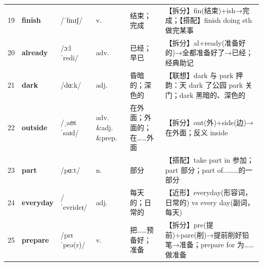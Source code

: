 \documentclass[UTF8,a4paper,11pt,oneside]{ctexbook}
\newcommand{\cellword}[1]{{\bfseries\textcolor{wordcol}{#1}}}
\newcommand{\cellipa}[1]{{\footnotesize\textcolor{ipacol}{#1}}}
\newcommand{\cellpos}[1]{\textcolor{poscol}{#1}}
\newcommand{\cellno}[1]{\textcolor{volcolor!75!black}{#1}}
\begin{document}
{\begin{longtable}{@{}C{0.045\textwidth}L{0.155\textwidth}L{0.175\textwidth}C{0.070\textwidth}L{0.180\textwidth}L{0.282\textwidth}@{}}
 \cellno{19} & \cellword{finish} & \cellipa{/ˈfɪnɪʃ/} & \cellpos{v.} & 结束；完成 & \textcolor{tagSplit}{【拆分】}fin(结束)+ish→\allowbreak{}完成；\textcolor{tagColloc}{【搭配】}finish doing sth 做完某事 \\
\cellno{20} & \cellword{already} & \cellipa{/ɔːlˈredi/} & \cellpos{adv.} & 已经；早已 & \textcolor{tagSplit}{【拆分】}al+ready(准备好的)→\allowbreak{}全都准备好了→\allowbreak{}已经；经典助记 \\
 \cellno{21} & \cellword{dark} & \cellipa{/dɑːk/} & \cellpos{adj.} & 昏暗的；深色的 & \textcolor{tagAssoc}{【联想】}dark 与 park 押韵：天 dark 了公园 park 关门；dark 黑暗的、深色的 \\
\cellno{22} & \cellword{outside} & \cellipa{/ˌaʊtˈsaɪd/} & \cellpos{adv. \&adj. \&prep.} & 在外面；外面的；在……外面 & \textcolor{tagSplit}{【拆分】}out(外)+side(边)→\allowbreak{}在外面；反义 inside \\
 \cellno{23} & \cellword{part} & \cellipa{/pɑːt/} & \cellpos{n.} & 部分 & \textcolor{tagColloc}{【搭配】}take part in 参加；part 部分；part of...……的一部分 \\
\cellno{24} & \cellword{everyday} & \cellipa{/ˈevrideɪ/} & \cellpos{adj.} & 每天的；日常的 & \textcolor{tagNear}{【近形】}everyday(形容词，日常的) vs every day(副词，每天) \\
 \cellno{25} & \cellword{prepare} & \cellipa{/prɪˈpeə(r)/} & \cellpos{v.} & 把……预备好；准备 & \textcolor{tagSplit}{【拆分】}pre(提前)+pare(削)→\allowbreak{}提前削好铅笔→\allowbreak{}准备；prepare for 为……做准备 \\
\end{longtable}
}

\end{document}
